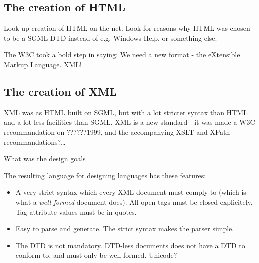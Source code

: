 \subsection{The \textsf{creation} of HTML}

\textsf{Look up creation of HTML on the net.  Look for reasons why HTML
  was chosen to be a SGML DTD instead of e.g. Windows Help, or
  something else}.


The W3C took a bold step in saying:  We need a new format - the
eXtensible Markup Language.  XML!


\subsection{The \textsf{creation} of XML}

XML was as HTML built on SGML, but with a lot stricter syntax than
HTML and a lot less facilities than SGML.  XML is a new standard - it
was made a W3C \textsf{recommandation on ??????1999}, and the
accompanying XSLT and XPath \textsf{recommandations?}\ldots

\textsf{What was the design goals}

The resulting language for designing languages has these features:
\begin{itemize}
\item A very strict syntax which every XML-document must comply to
  (which is what a \emph{well-formed} document does).
  All open tags must be closed explicitely.  Tag attribute values must
  be in quotes.
  
\item Easy to parse and generate.  The strict syntax makes the parser
  simple.

\item The DTD is not mandatory.  DTD-less documents does not have a
  DTD to conform to, and must only be well-formed.  \textsf{Unicode?}
\end{itemize}

